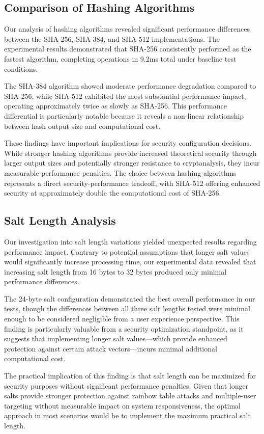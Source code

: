 \documentclass[11pt,a4paper]{article}
\begin{document}
\subsection{Comparison of Hashing Algorithms}
Our analysis of hashing algorithms revealed significant performance differences between the SHA-256, SHA-384, and SHA-512 implementations. The experimental results demonstrated that SHA-256 consistently performed as the fastest algorithm, completing operations in 9.2ms total under baseline test conditions.

The SHA-384 algorithm showed moderate performance degradation compared to SHA-256, while SHA-512 exhibited the most substantial performance impact, operating approximately twice as slowly as SHA-256. This performance differential is particularly notable because it reveals a non-linear relationship between hash output size and computational cost.

These findings have important implications for security configuration decisions. While stronger hashing algorithms provide increased theoretical security through larger output sizes and potentially stronger resistance to cryptanalysis, they incur measurable performance penalties. The choice between hashing algorithms represents a direct security-performance tradeoff, with SHA-512 offering enhanced security at approximately double the computational cost of SHA-256.
\subsection{Salt Length Analysis}
Our investigation into salt length variations yielded unexpected results regarding performance impact. Contrary to potential assumptions that longer salt values would significantly increase processing time, our experimental data revealed that increasing salt length from 16 bytes to 32 bytes produced only minimal performance differences.

The 24-byte salt configuration demonstrated the best overall performance in our tests, though the differences between all three salt lengths tested were minimal enough to be considered negligible from a user experience perspective. This finding is particularly valuable from a security optimization standpoint, as it suggests that implementing longer salt values—which provide enhanced protection against certain attack vectors—incurs minimal additional computational cost.

The practical implication of this finding is that salt length can be maximized for security purposes without significant performance penalties. Given that longer salts provide stronger protection against rainbow table attacks and multiple-user targeting without measurable impact on system responsiveness, the optimal approach in most scenarios would be to implement the maximum practical salt length.
\end{document}
